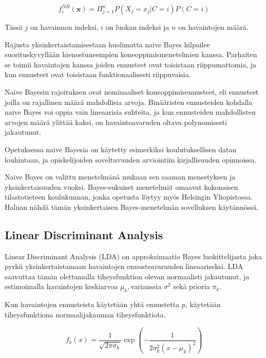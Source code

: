 \documentclass[finnish,twoside,openright]{HYgraduMLDS}
\begin{document}
\begin{equation}
    f^{NB}_i(\textbf{x}) = \Pi^n_{j=1} P(X_j=x_j | C=i) P(C=i)
\end{equation}

Tässä $j$ on havainnon indeksi, $i$ on luokan indeksi ja $n$ on havaintojen määrä. 

Rajusta yksinkertaistamisestaan huolimatta naive Bayes kilpailee suorituskyvyllään hienostuneempien koneoppimismenetelmien kanssa\cite{rish2001empirical}. Parhaiten se toimii havaintojen kanssa joiden ennusteet ovat toisistaan riippumattomia, ja kun ennusteet ovat toisistaan funktionaalisesti riippuvaisia. 

Naive Bayesin rajoituksen ovat nominaaliset koneoppimisennusteet, eli ennusteet joilla on rajallinen määrä mahdollisia arvoja. Binääristen ennusteiden kohdalla naive Bayes voi oppia vain lineaarisia suhteita, ja kun ennusteiden mahdollisten arvojen määrä ylittää kaksi, on havaintoavaruden oltava polynomisesti jakautunut\cite{rish2001empirical}.

Opetuksessa naive Bayesia on käytetty esimerkiksi koulutuksellisen datan louhintaan\cite{bhardwaj2012data}, ja opiskelijoiden soveltuvuuden arviointiin kirjallisuuden opinnoissa\cite{hellas2018predicting}.

Naive Bayes on valittu menetelmänä mukaan sen saaman menestyksen ja yksinkertaisuuden vuoksi. Bayes-sukuiset menetelmät omaavat kokonaisen tilastotieteen koulukunnan, jonka opetusta löytyy myös Helsingin Yliopistossa. Haluan nähdä tämän yksinkertaisen Bayes-menetelmän sovelluksen käytännössä.


\subsection{Linear Discriminant Analysis}

Linear Discriminant Analysis (LDA) on approksimaatio Bayes luokittelijasta joka pyrkii yksinkertaistamaan havaintojen ennusteavaruuden lineaariseksi. LDA saavuttaa tämän olettamalla tiheysfunktion olevan normaalisti jakautunut, ja estimoimalla havaintojen keskiarvoa $\mu_k, $varianssia $\sigma^2$ sekä prioria $\pi_k$.

Kun havaintojen ennusteista käytetään yhtä ennustetta $p$, käytetään tiheysfunktiona normaalijakauman tiheysfunktiota.

\begin{equation}
    f_k(x) = \frac{1}{\sqrt{2 \pi \sigma_k}} \exp{(-\frac{1}{2 \sigma^2_k (x - \mu_k)^2})}
\end{equation}
\end{document}
